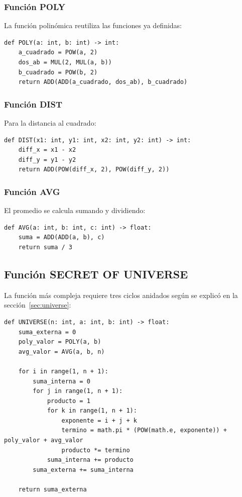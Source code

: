 \documentclass{article}
\begin{document}
\subsubsection{Función POLY}

La función polinómica reutiliza las funciones ya definidas:

\begin{lstlisting}[style=pythonstyle]
def POLY(a: int, b: int) -> int:
    a_cuadrado = POW(a, 2)
    dos_ab = MUL(2, MUL(a, b))
    b_cuadrado = POW(b, 2)
    return ADD(ADD(a_cuadrado, dos_ab), b_cuadrado)
\end{lstlisting}

\subsubsection{Función DIST}

Para la distancia al cuadrado:

\begin{lstlisting}[style=pythonstyle]
def DIST(x1: int, y1: int, x2: int, y2: int) -> int:
    diff_x = x1 - x2
    diff_y = y1 - y2
    return ADD(POW(diff_x, 2), POW(diff_y, 2))
\end{lstlisting}

\subsubsection{Función AVG}

El promedio se calcula sumando y dividiendo:

\begin{lstlisting}[style=pythonstyle]
def AVG(a: int, b: int, c: int) -> float:
    suma = ADD(ADD(a, b), c)
    return suma / 3
\end{lstlisting}

\subsection{Función SECRET OF UNIVERSE}

La función más compleja requiere tres ciclos anidados según se explicó en la sección~\ref{sec:universe}:

\begin{lstlisting}[style=pythonstyle]
def UNIVERSE(n: int, a: int, b: int) -> float:
    suma_externa = 0
    poly_valor = POLY(a, b)
    avg_valor = AVG(a, b, n)
    
    for i in range(1, n + 1):
        suma_interna = 0
        for j in range(1, n + 1):
            producto = 1
            for k in range(1, n + 1):
                exponente = i + j + k
                termino = math.pi * (POW(math.e, exponente)) + poly_valor + avg_valor
                producto *= termino
            suma_interna += producto
        suma_externa += suma_interna
    
    return suma_externa
\end{lstlisting}
\end{document}

